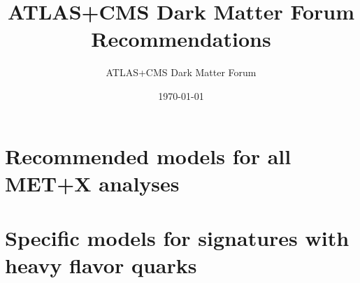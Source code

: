 \documentclass[a4,debug,notitlepage,nobib]{tufte-book}
\title{ATLAS+CMS Dark Matter Forum Recommendations}
\author{ATLAS+CMS Dark Matter Forum}
\date{\today}
\newif\ifNotMonojetTTBarOnly
\newcommand{\blankpage}{\newpage\hbox{}\thispagestyle{empty}\newpage}
\begin{document}
\morefloats
\setcounter{secnumdepth}{3} %



\blankpage

\ifNotMonojetTTBarOnly
\chapter{Introduction}
\label{sec:Introduction}

\fi

\ifNotMonojetTTBarOnly
\chapter{Overall choices for simplified models}
\label{sec:SimplifiedModelsIntro} 

\fi

\chapter{Recommended models for all MET+X analyses}
\label{subsec:MonojetLikeModels}


% 

\ifNotMonojetTTBarOnly
\chapter{Specific models for signatures with EW bosons}
\label{subsec:EWSpecificModels}

\fi

\chapter{Specific models for signatures with heavy flavor quarks}
\label{subsec:DMHFModels}


% 

\ifNotMonojetTTBarOnly
\chapter{Validity of EFT approach}
\label{sec:EFTValidity} 

\fi
\end{document}
